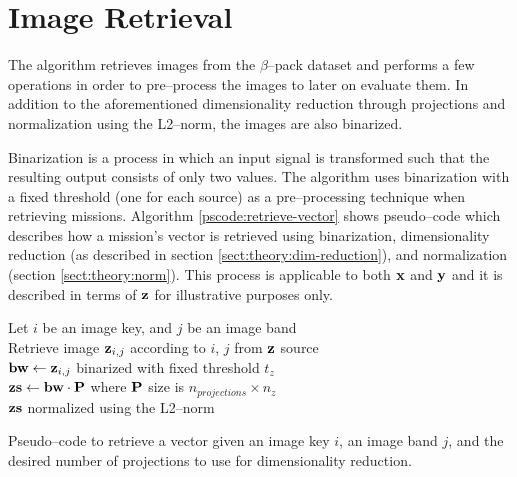 \section{Image Retrieval} \label{sect:meth:image-retrieval}

The \mlblink algorithm retrieves images from the $\beta$--pack dataset and performs a few operations in order to pre--process the images to later on evaluate them. In addition to the aforementioned dimensionality reduction through projections and normalization using the L2--norm, the images are also binarized. \newline

Binarization is a process in which an input signal is transformed such that the resulting output consists of only two values. The \mlblink algorithm uses binarization with a fixed threshold (one for each source) as a pre--processing technique when retrieving missions. Algorithm \ref{pscode:retrieve-vector} shows pseudo--code which describes how a mission's vector is retrieved using binarization, dimensionality reduction (as described in section \ref{sect:theory:dim-reduction}), and normalization (section \ref{sect:theory:norm}). This process is applicable to both $\boldsymbol{\mathbf{x}}$ and $\boldsymbol{\mathbf{y}}$ and it is described in terms of $\boldsymbol{\mathbf{z}}$ for illustrative purposes only.

\vspace{0.4cm}
\begin{algorithm}[H]
    \SetAlgoLined
         {
            Let $i$ be an image key, and $j$ be an image band \\
            Retrieve image $\boldsymbol{\mathbf{z}}_{i,j}$ according to $i$, $j$ from $\boldsymbol{\mathbf{z}}$ source \\
            $\boldsymbol{\mathbf{bw}} \gets \boldsymbol{\mathbf{z}}_{i,j}$ binarized with fixed threshold $t_z$ \\
            $\boldsymbol{\mathbf{zs}} \gets \boldsymbol{\mathbf{bw}} \cdot \boldsymbol{\mathbf{P}}$ where $\boldsymbol{\mathbf{P}}$ size is $n_{projections} \times n_z$ \\
            \Return $\boldsymbol{\mathbf{zs}}$ normalized using the L2--norm
        }
    \caption{Pseudo--code to retrieve a vector given an image key $i$, an image band $j$, and the desired number of projections to use for dimensionality reduction.}
    \label{pscode:retrieve-vector}
\end{algorithm}
\vspace{0.4cm}